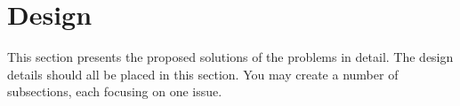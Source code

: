 \documentclass[12pt,a4paper]{article}
\begin{document}













\section{Design}

This section presents the proposed solutions of the problems in detail. The design details should all be placed in this section. You may create a number of subsections, each focusing on one issue.
\end{document}
